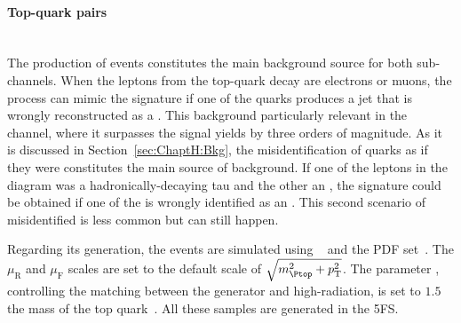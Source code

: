 \paragraph{Top-quark pairs}\mbox{}\\
The production of \ttbar events constitutes the main background source
for both \dileptau sub-channels. %
When the leptons from the top-quark decay are electrons or muons, the \ttbar process can mimic the
\dileptau signature if one of the quarks produces a jet that is wrongly reconstructed 
as a \tauhad. This background particularly relevant in the \dilepOStau channel, where
it surpasses the signal yields by three orders of magnitude.
As it is discussed in Section~\ref{sec:ChaptH:Bkg}, the misidentification of quarks as if they were \tauhad constitutes the main source of background.
If one of the leptons in the \ttbar diagram was a hadronically-decaying tau and the other an \emu, the 
\dileptau signature could be obtained if one of the \bjets is wrongly identified as an \emu. This second scenario
of misidentified \emu is less common but can still happen.



Regarding its generation, the \ttbar events are simulated using 
\POWHEGBOX[v2]~\cite{Frixione:2007nw, Nason:2004rx, Frixione:2007vw, Alioli:2010xd} and the \NNPDF[3.0nlo] PDF set~\cite{Ball:2014uwa}.
The $\mu_{\text{R}}$  and $\mu_{\text{F}}$ scales are set to the default scale of \(\sqrt{\mtop^{2} + \pT^{2}}\).
The parameter \hdamp, controlling 
the matching between the \POWHEG generator and high-\pT radiation, is set to 
 $1.5$ the mass of the top quark~\cite{ATL-PHYS-PUB-2016-020}.
All these samples are generated in the 5FS.



